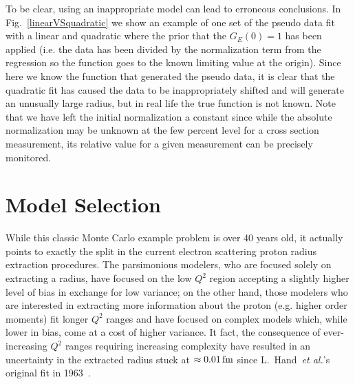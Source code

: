 \documentclass[10pt,aps,prc,twocolumn]{revtex4-1}
\begin{document}
To be clear, using an inappropriate model can lead to erroneous conclusions.
In Fig.~\ref{linearVSquadratic} we show an
example of one set of the pseudo data fit with a linear and quadratic where the prior that the
$G_E(0)=1$ has been applied (i.e. the data has been divided by the normalization term from the regression
so the function goes to the known limiting value at the origin).
Since here we know the function that generated the pseudo data, it is clear that the quadratic
fit has caused the data to be inappropriately shifted and will generate an unusually large radius, 
but in real life the true function is not known.
Note that we have left the initial normalization a constant since while the absolute normalization may be
unknown at the few percent level for a cross section measurement, its relative value for a given measurement
can be precisely monitored. 

\section{Model Selection}

While this classic Monte Carlo example problem is over 40 years old, it actually points to exactly the split in 
the current electron scattering proton radius extraction procedures.     The parsimonious modelers, who are 
focused solely on extracting a radius, have focused on the low $Q^2$ region accepting a slightly higher 
level of bias in exchange for low variance; on the other hand, those modelers who are interested in extracting more information 
about the proton (e.g. higher order moments) fit longer $Q^2$ ranges and have
focused on complex models which, while lower in bias, come at a cost of higher variance.  
It fact, the consequence of ever-increasing $Q^2$ ranges requiring increasing complexity have resulted in
an uncertainty in the extracted radius 
stuck at $\approx \unit[0.01]{fm}$ since L.~Hand~\textit{et al.}'s original fit in 1963~\cite{Hand:1963zz}.
\end{document}

